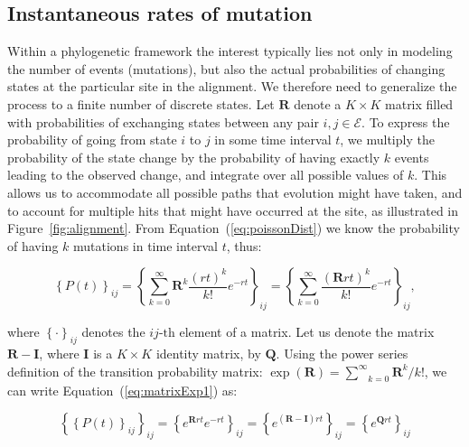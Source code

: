 
\subsection{Instantaneous rates of mutation\label{sub:rates}}

Within a phylogenetic framework the interest typically lies not only in modeling the number of events (mutations), but also the actual probabilities of changing states at the particular site in the alignment. 
We therefore need to generalize the process to a finite number of discrete states.
Let $\mathbf{R}$ denote a $K \times K$ matrix filled with probabilities of exchanging states between any pair $i,j\in \mathcal{E}$.
To express the probability of going from state $i$ to $j$ in some time interval $t$, we multiply the probability of the state change by the probability of having exactly $k$ events leading to the observed change, and integrate over all possible values of $k$.
This allows us to accommodate all possible paths that evolution might have taken, and to account for multiple hits that might have occurred at the site, as illustrated in Figure~\ref{fig:alignment}.
From Equation~(\ref{eq:poissonDist}) we know the probability of having $k$ mutations in time interval $t$, thus:

\begin{equation}
\left\{ P(t) \right\} _{ij}= \left\{ \underset{k=0}{\overset{\infty}{\sum}}\mathbf{R}^{k}\frac{(r t)^{k}}{k!}e^{-r t} \right\} _{ij} = \left\{ \underset{k=0}{\overset{\infty}{\sum}}\frac{(\mathbf{R}r t)^{k}}{k!}e^{-r t} \right\} _{ij},
\label{eq:matrixExp1}
\end{equation}

\noindent
where $\left\{  \cdot \right\} _{ij}$ denotes the $ij\text{-th}$ element of a matrix.
Let us denote the matrix $\mathbf{R}-\mathbf{I}$, where $\mathbf{I}$ is a $K \times K$ identity matrix, by $\mathbf{Q}$.
Using the power series definition of the transition probability matrix: $\exp(\mathbf{R})=\underset{k=0}{\overset{\infty}{\sum}}\mathbf{R}^{k}/k!$, we can write Equation~(\ref{eq:matrixExp1}) as:

\begin{equation}
\left\{ \left\{ P(t)\right\} _{ij} \right\} _{ij} = \left\{ e^{\mathbf{R}r t}e^{-r t} \right\} _{ij} = \left\{ e^{(\mathbf{R}-\mathbf{I})r t} \right\} _{ij}= \left\{ e^{\mathbf{Q}r t} \right\} _{ij}
\label{eq:matrixExp2}
\end{equation}

